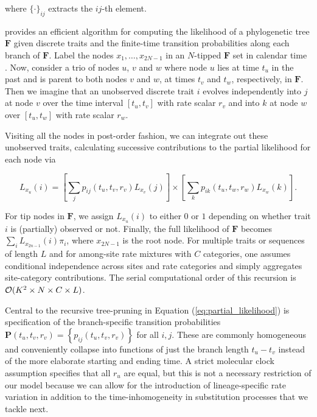 where $\{ \cdot \}_{ij}$ extracts the $ij$-th element.

\newcommand{\tmax}{t_{\mbox{\tiny max}}}

\citet{Felsenstein1981} provides an efficient algorithm for computing the likelihood of a phylogenetic tree $\mathbf{F}$ given discrete traits and the finite-time transition probabilities along each branch of $\mathbf{F}$.
Label the nodes $x_{1},\ldots,x_{2N-1}$ in an $N$-tipped $\mathbf{F}$ set in calendar time%
.
Now, consider a trio of nodes $u$, $v$ and $w$ where node $u$ lies at time $t_{u}$ in the past and is parent to both nodes $v$ and $w$, at times $t_v$ and $t_w$, respectively, in $\mathbf{F}$.
Then we imagine that an unobserved discrete trait $i$ evolves independently into $j$ at node $v$ over the time interval $\left[t_{u},t_{v}\right]$ with rate scalar $r_{v}$ and into $k$ at node $w$ over $\left[t_{u}, t_{w}\right]$ with rate scalar $r_{w}$.

Visiting all the nodes in post-order fashion, we can integrate out these unobserved traits, calculating successive contributions to the partial likelihood for each node via

\begin{equation}
L_{x_{u}}(i)=
\left[\underset{j}{\sum}p_{ij}(t_{u},t_{v},r_{v})L_{x_{v}}(j)\right]
\times
\left[\underset{k}{\sum}p_{ik}(t_{u},t_{w},r_{w})L_{x_{w}}(k)\right].
\label{eq:partial_likelihood}
\end{equation}

For tip nodes in $\mathbf{F}$, we assign $L_{x_{u}}(i)$ to either $0$ or $1$ depending on whether trait $i$ is (partially) observed or not.  Finally, the full likelihood of $\mathbf{F}$ becomes $\sum_{i} L_{x_{2n-1}}(i) \pi_{i}$, where $x_{2N-1}$ is the root node.  For multiple traits or sequences of length $L$ and for among-site rate mixtures with $C$ categories, one assumes conditional independence across sites and rate categories and simply aggregates site-category contributions.  The serial computational order of this recursion is ${\cal O}( K^2 \times N \times C \times L)$.  

Central to the recursive tree-pruning in Equation (\ref{eq:partial_likelihood}) is specification of the branch-specific transition probabilities
$\mathbf{P}(t_u, t_v, r_v) = \left\{
p_{ij}(t_u,t_v,r_v)
\right\}$ for all $i,j$.  These are commonly homogeneous and conveniently collapse into
functions of just the branch length $t_u - t_v$ instead of the more elaborate starting and ending time.
A strict molecular clock assumption specifies that all $r_u$ are equal, but this is not a necessary restriction of our model because we can allow for the introduction of lineage-specific rate variation in addition to the time-inhomogeneity in substitution processes that we tackle next. 

